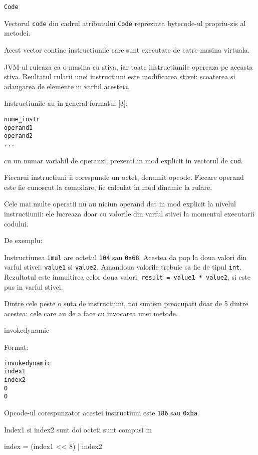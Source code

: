 \documentclass[]{article}
\newenvironment{Shaded}{}{}
\newcommand{\DecValTok}[1]{\textcolor[rgb]{0.25,0.63,0.44}{#1}}
\newcommand{\NormalTok}[1]{#1}
\begin{document}
\texttt{Code}

Vectorul \texttt{code} din cadrul atributului \texttt{Code} reprezinta
bytecode-ul propriu-zis al metodei.

Acest vector contine instructiunile care sunt executate de catre masina
virtuala.

JVM-ul ruleaza ca o masina cu stiva, iar toate instructiunile opereaza
pe aceasta stiva. Reultatul rularii unei instructiuni este modificarea
stivei: scoaterea si adaugarea de elemente in varful acesteia.

Instructiunile au in general formatul {[}3{]}:

\begin{verbatim}
nume_instr
operand1
operand2
...
\end{verbatim}

cu un numar variabil de operanzi, prezenti in mod explicit in vectorul
de \texttt{cod}.

Fiecarui instructiuni ii corespunde un octet, denumit opcode. Fiecare
operand este fie cunoscut la compilare, fie calculat in mod dinamic la
rulare.

Cele mai multe operatii nu au niciun operand dat in mod explicit la
nivelul instructiunii: ele lucreaza doar cu valorile din varful stivei
la momentul executarii codului.

De exemplu:

Instructiunea \texttt{imul} are octetul \texttt{104} sau \texttt{0x68}.
Acestea da pop la doua valori din varful stivei: \texttt{value1} si
\texttt{value2}. Amandoua valorile trebuie sa fie de tipul \texttt{int}.
Rezultatul este inmultirea celor doua valori:
\texttt{result\ =\ value1\ *\ value2}, si este pus in varful stivei.

Dintre cele peste o suta de instructiuni, noi suntem preocupati doar de
5 dintre acestea: cele care au de a face cu invocarea unei metode.

invokedynamic

Format:

\begin{verbatim}
invokedynamic
index1
index2
0
0
\end{verbatim}

Opcode-ul corespunzator acestei instructiuni este \texttt{186} sau
\texttt{0xba}.

Index1 si index2 sunt doi octeti sunt compusi in

\begin{Shaded}
\begin{Highlighting}[]
\NormalTok{index = (index1 << }\DecValTok{8}\NormalTok{) | index2}
\end{Highlighting}
\end{Shaded}
\end{document}
